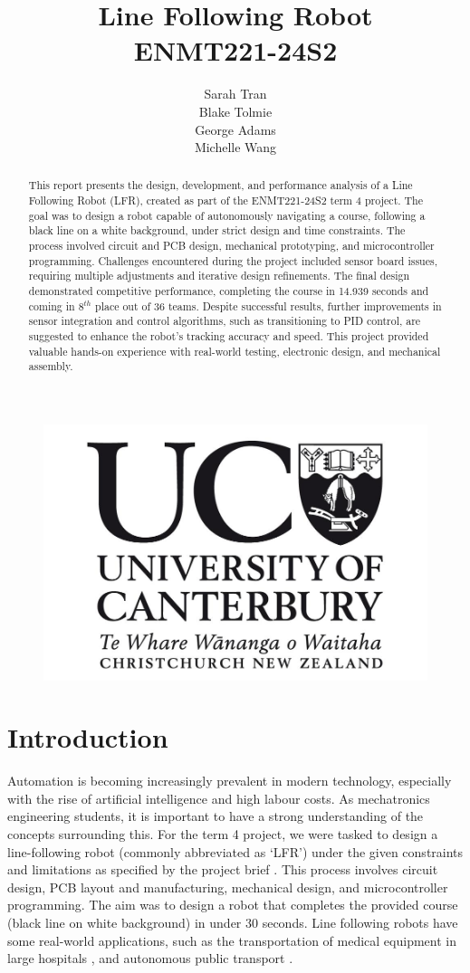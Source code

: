 \documentclass{article}
\title{%
  \textbf{Line Following Robot} \\
  \large{ENMT221-24S2} \\}
\author{Sarah Tran \\Blake Tolmie \\George Adams \\Michelle Wang }
\begin{document}
\begin{figure}
\centering
\includegraphics[width=0.4\linewidth]{REPORT/uclogov3.jpeg}
\end{figure}



\maketitle
\newpage
\begin{abstract}
This report presents the design, development, and performance analysis of a Line Following Robot (LFR), created as part of the ENMT221-24S2 term 4 project. The goal was to design a robot capable of autonomously navigating a course, following a black line on a white background, under strict design and time constraints. The process involved circuit and PCB design, mechanical prototyping, and microcontroller programming. Challenges encountered during the project included sensor board issues, requiring multiple adjustments and iterative design refinements. The final design demonstrated competitive performance, completing the course in 14.939 seconds and coming in $8^{th}$ place out of 36 teams. Despite successful results, further improvements in sensor integration and control algorithms, such as transitioning to PID control, are suggested to enhance the robot's tracking accuracy and speed. This project provided valuable hands-on experience with real-world testing, electronic design, and mechanical assembly.


\end{abstract}
\newpage
\tableofcontents
\newpage

\section{Introduction}

Automation is becoming increasingly prevalent in modern technology, especially with the rise of artificial intelligence and high labour costs. As mechatronics engineering students, it is important to have a strong understanding of the concepts surrounding this. For the term 4 project, we were tasked to design a line-following robot (commonly abbreviated as ‘LFR’) under the given constraints and limitations as specified by the project brief \cite{enmt221_lfr2024}. This process involves circuit design, PCB layout and manufacturing, mechanical design, and microcontroller programming. The aim was to design a robot that completes the provided course (black line on white background) in under 30 seconds. Line following robots have some real-world applications, such as the transportation of medical equipment in large hospitals \cite{kumaresan2017line}, and autonomous public transport \cite{gumus2016line}.  
\end{document}
